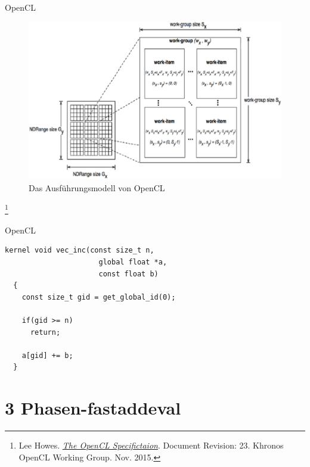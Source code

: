 \documentclass[10pt]{beamer}
\let\svthefootnote\thefootnote
\begin{document}
\begin{frame}{OpenCL}
  \begin{figure}
    \centering
    \includegraphics[width=.75\linewidth]{figures/fg-opencl-execution-model.pdf}
    \caption{Das Ausführungsmodell von OpenCL}
  \end{figure}

  \footnotesize
  \let\thefootnote\relax\footnote{Lee Howes. \href{https://www.khronos.org/registry/OpenCL/specs/opencl-2.0.pdf}{\textit{The OpenCL Specifictaion}}. Document Revision: 23. Khronos OpenCL Working Group. Nov. 2015.}
  \addtocounter{footnote}{-1}\let\thefootnote\svthefootnote\relax
  \normalsize
\end{frame}

\begin{frame}[fragile]{OpenCL}
  \begin{lstlisting}[style=CStyle]
  kernel void vec_inc(const size_t n,
                      global float *a,
                      const float b)
  {
    const size_t gid = get_global_id(0);

    if(gid >= n)
      return;

    a[gid] += b;
  }
  \end{lstlisting}
\end{frame}
\section{3 Phasen-fastaddeval}
\end{document}
